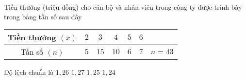 \begin{ex}%
	Tiền thưởng (triệu đồng) cho cán bộ và nhân viên trong công ty được trình bày trong bảng tần số sau đây
	\begin{center}
		\begin{tabular}{|c|c|c|c|c|c|c|}
			\hline
			Tiền thưởng $(x)$ & $2$ & $3$ & $4$ & $5$ & $6$ &      \\ \hline
			Tần số $(n)$    & $5$  & $15$  & $10$ & $6$ & $7$  & $n=43$ \\ \hline
		\end{tabular}
	\end{center}
	Độ lệch chuẩn là
	\choice
	{\True $1{,}26$}
	{$1{,}27$}
	{$1{,}25$}
	{$1{,}24$}
\end{ex}



